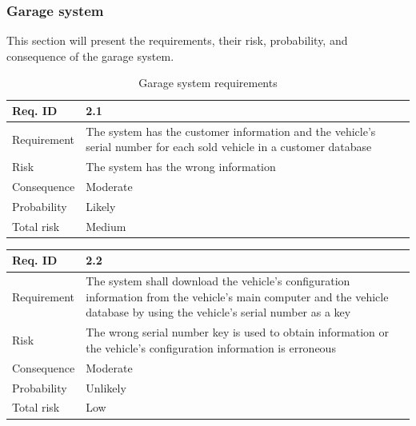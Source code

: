 \subsubsection{Garage system}

This section will present the requirements, their risk, probability, and consequence of the garage system. 

\begin{table}[H]
\centering
\caption{Garage system requirements}
\label{table:garage}
\begin{tabularx}{1.0\textwidth}{
    |p{}%
    |p{}|%
}
\hline

Req. ID
& 2.1
\\
\hline

Requirement
& The system has the customer information and the vehicle's serial number for each sold vehicle in a customer database
\\
\hline

Risk
& 
The system has the wrong information
\\
\hline

Consequence
&
Moderate
\\
\hline

Probability
&
Likely
\\
\hline

Total risk
&
Medium
\\
\hline

\end{tabularx}
\end{table}


\begin{table}[H]
\centering
\begin{tabularx}{1.0\textwidth}{
    |p{}%
    |p{}|%
}
\hline

Req. ID
& 2.2
\\
\hline

Requirement
& The system shall download the vehicle's configuration information from the vehicle's main computer and the vehicle database by using the vehicle's serial number as a key
\\
\hline

Risk
& 
The wrong serial number key is used to obtain information or the vehicle's configuration information is erroneous
\\
\hline

Consequence
&
Moderate
\\
\hline

Probability
&
Unlikely
\\
\hline

Total risk
&
Low
\\
\hline

\end{tabularx}
\end{table}

